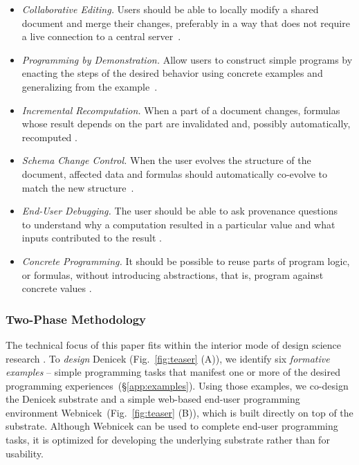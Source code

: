 \documentclass[sigconf]{acmart}
\begin{document}
\begin{itemize}
\item \emph{Collaborative Editing.} Users should be able to locally modify a shared document
  and merge their changes, preferably in a way that does not require a live connection to a central server~\cite{kleppmann-2019-local}.
\item \emph{Programming by Demonstration.} Allow users to construct simple programs by
  enacting the steps of the desired behavior using concrete examples and generalizing from the example~\cite{leiva-2021-rapido,cypher-1993-pbd}.
\item \emph{Incremental Recomputation.} When a part of a document changes, formulas whose result
  depends on the part are invalidated and, possibly automatically, recomputed \cite{teitelbaum-1981-cps,mcdirmid-2013-usable,horowitz-2023-engraft}.
\item \emph{Schema Change Control.} When the user evolves the structure of the document, affected
  data and formulas should automatically co-evolve to match the new structure~\cite{litt-2020-cambria,edwards-2025-schema}.
\item \emph{End-User Debugging.} The user should be able to ask provenance questions~\cite{cheney-2009-provenance} to understand
  why a computation resulted in a particular value and what inputs contributed to the result \cite{ko-2009-whyline}.
\item \emph{Concrete Programming.} It should be possible to reuse parts of program logic, or formulas,
  without introducing abstractions, that is, program against concrete values \cite{edwards-2006-copypaste,edwards-2022-copypaste}.
\end{itemize}

\subsubsection*{Two-Phase Methodology}
The technical focus of this paper fits within the interior mode of design science research \cite{adam-2021-dsr}.
To \emph{design} Denicek (Fig.~\ref{fig:teaser} (A)), we identify six \emph{formative examples} -- simple programming
tasks that manifest one or more of the desired programming experiences~(\S\ref{app:examples}).
Using those examples, we co-design the Denicek substrate and a simple web-based end-user programming
environment Webnicek~(Fig.~\ref{fig:teaser} (B)), which is built directly on top of the substrate. Although
Webnicek can be used to complete end-user programming tasks, it is optimized for developing the
underlying substrate rather than for usability.
\end{document}
